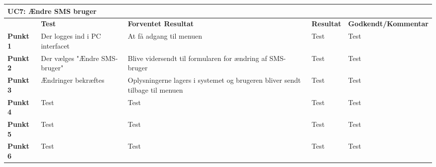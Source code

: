 \begin{table}[htbp] \centering
\begin{tabular}{|p{}|p{}|p{3cm}|p{3cm}|p{3cm}|} %
	\hline
\multicolumn{5}{|l|}{\textbf{UC7: Ændre SMS bruger}} \\\hline
	&\textbf{Test} &\textbf{Forventet Resultat} &\textbf{Resultat} &\textbf{Godkendt/Kommentar} \\\hline
\textbf{Punkt 1}		&Der logges ind i PC interfacet	&At få adgang til menuen 	&Test	&Test \\\hline
\textbf{Punkt 2}		&Der vælges "Ændre SMS-bruger"	&Blive vidersendt til formularen for ændring af SMS-bruger 	&Test	&Test \\\hline
\textbf{Punkt 3}		&Ændringer bekræftes				&Oplysningerne lagers i systemet og brugeren bliver sendt tilbage til menuen 	&Test	&Test \\\hline
\textbf{Punkt 4}		&Test	&Test 	&Test	&Test \\\hline
\textbf{Punkt 5}		&Test	&Test 	&Test	&Test \\\hline
\textbf{Punkt 6}		&Test	&Test 	&Test	&Test \\\hline
	\end{tabular}
	\label{ATUC7} 
\end{table}
